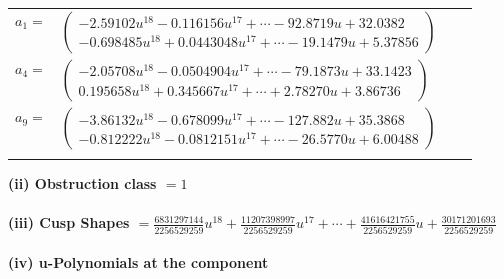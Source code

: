 \documentclass[1p]{elsarticle_modified}
\theoremstyle{definition}
\begin{document}
\begin{tabular}{m{7pt} m{180pt} m{7pt} m{180pt} }
\flushright $a_{1}=$&$\begin{pmatrix}-2.59102 u^{18}-0.116156 u^{17}+\cdots-92.8719 u+32.0382\\-0.698485 u^{18}+0.0443048 u^{17}+\cdots-19.1479 u+5.37856\end{pmatrix}$ \\
\flushright $a_{4}=$&$\begin{pmatrix}-2.05708 u^{18}-0.0504904 u^{17}+\cdots-79.1873 u+33.1423\\0.195658 u^{18}+0.345667 u^{17}+\cdots+2.78270 u+3.86736\end{pmatrix}$ \\
\flushright $a_{9}=$&$\begin{pmatrix}-3.86132 u^{18}-0.678099 u^{17}+\cdots-127.882 u+35.3868\\-0.812222 u^{18}-0.0812151 u^{17}+\cdots-26.5770 u+6.00488\end{pmatrix}$\\&\end{tabular}
\flushleft \textbf{(ii) Obstruction class $= 1$}\\~\\
\flushleft \textbf{(iii) Cusp Shapes $= \frac{6831297144}{2256529259} u^{18}+\frac{11207398997}{2256529259} u^{17}+\cdots+\frac{41616421755}{2256529259} u+\frac{30171201693}{2256529259}$}\\~\\
\newpage\renewcommand{\arraystretch}{1}
\flushleft \textbf{(iv) u-Polynomials at the component}\newline \\
\end{document}

